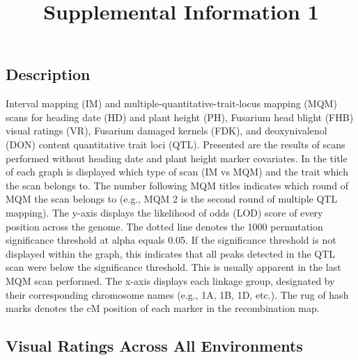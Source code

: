 \documentclass[
]{article}
\title{Supplemental Information 1}
\author{}
\date{\vspace{-2.5em}}
\begin{document}
\maketitle

\subsection{Description}\label{description}

Interval mapping (IM) and multiple-quantitative-trait-locus mapping
(MQM) scans for heading date (HD) and plant height (PH), Fusarium head
blight (FHB) visual ratings (VR), Fusarium damaged kernels (FDK), and
deoxynivalenol (DON) content quantitative trait loci (QTL). Presented
are the results of scans performed without heading date and plant height
marker covariates. In the title of each graph is displayed which type of
scan (IM vs MQM) and the trait which the scan belongs to. The number
following MQM titles indicates which round of MQM the scan belongs to
(e.g., MQM 2 is the second round of multiple QTL mapping). The y-axis
displays the likelihood of odds (LOD) score of every position across the
genome. The dotted line denotes the 1000 permutation significance
threshold at alpha equals 0.05. If the significance threshold is not
displayed within the graph, this indicates that all peaks detected in
the QTL scan were below the significance threshold. This is usually
apparent in the last MQM scan performed. The x-axis displays each
linkage group, designated by their corresponding chromosome names (e.g.,
1A, 1B, 1D, etc.). The rug of hash marks denotes the cM position of each
marker in the recombination map.

\subsection{Visual Ratings Across All
Environments}\label{visual-ratings-across-all-environments}
\end{document}
